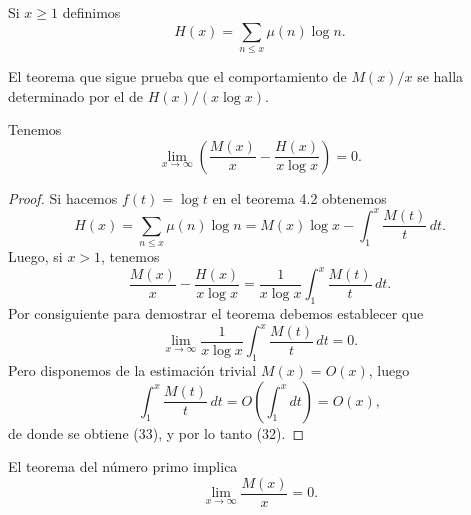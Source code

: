 \documentclass[12pt,a4paper]{book}
\begin{document}
    \begin{definicion}
        Si $x\geq1$ definimos
        \begin{equation*}
            H(x)=\sum_{n\leq x}\mu(n)\log n.
        \end{equation*}
    \end{definicion}

    El teorema que sigue prueba que el comportamiento de $M(x)/x$ se halla
    determinado por el de $H(x)/(x\log x)$.

    \begin{teorema}
        Tenemos
        \begin{equation}
            \lim_{x\to\infty}\left(\frac{M(x)}{x}-\frac{H(x)}{x\log x}\right)=0.
        \end{equation}
    \end{teorema}

    \begin{proof}
        Si hacemos $f(t)=\log t$ en el teorema 4.2 obtenemos
        \begin{equation*}
            H(x)=\sum_{n\leq x}\mu(n)\log n=M(x)\log x-\int_{1}^{x}\frac{M(t)}{t}\,dt.
        \end{equation*}
        Luego, si $x>1$, tenemos
        \begin{equation*}
            \frac{M(x)}{x}-\frac{H(x)}{x\log x}=\frac{1}{x\log x}\int_{1}^{x}\frac{M(t)}{t}\,dt.
        \end{equation*}
        Por consiguiente para demostrar el teorema debemos establecer que
        \begin{equation}
            \lim_{x\to\infty}\frac{1}{x\log x}\int_{1}^{x}\frac{M(t)}{t}\,dt=0.
        \end{equation}
        Pero disponemos de la estimación trivial $M(x)=O(x)$, luego
        \begin{equation*}
            \int_{1}^{x}\frac{M(t)}{t}\,dt=O\left(\int_{1}^{x} dt\right)=O(x),
        \end{equation*}
        de donde se obtiene (33), y por lo tanto (32).
    \end{proof}

    \begin{teorema}
        El teorema del número primo implica
        \begin{equation*}
            \lim_{x\to\infty}\frac{M(x)}{x}=0.
        \end{equation*}
    \end{teorema}
\end{document}
